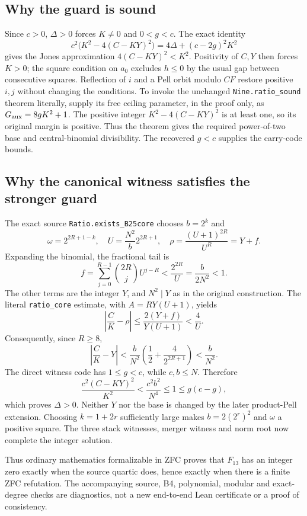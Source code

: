 \subsection*{Why the guard is sound}
Since $c>0$, $\Delta>0$ forces $K\ne0$ and $0<g<c$.  The exact identity
\[
 c^2\bigl(K^2-4(C-KY)^2\bigr)
   =4\Delta+(c-2g)^2K^2
\]
gives the Jones approximation $4(C-KY)^2<K^2$.  Positivity of $C,Y$
then forces $K>0$; the square condition on $a_0$ excludes $h\le0$ by the
usual gap between consecutive squares.  Reflection of $i$ and a Pell
orbit modulo $CF$ restore positive $i,j$ without changing the conditions.
To invoke the unchanged \texttt{Nine.ratio\_sound} theorem literally, supply
its free ceiling parameter, in the proof only, as $G_{\rm aux}=8gK^2+1$.
The positive integer $K^2-4(C-KY)^2$ is at least one, so its original
margin is positive.  Thus the theorem gives the required power-of-two
base and central-binomial divisibility.  The recovered $g<c$ supplies
the carry-code bounds.

\subsection*{Why the canonical witness satisfies the stronger guard}
The exact source \texttt{Ratio.exists\_B25core} chooses $b=2^k$ and
\[
 \omega=2^{2R+1-k},\quad
 U=\frac{N^2}{b}2^{2R+1},\quad
 \rho=\frac{(U+1)^{2R}}{U^R}=Y+f.
\]
Expanding the binomial, the fractional tail is
\[
 f=\sum_{j=0}^{R-1}\binom{2R}{j}U^{j-R}
   <\frac{2^{2R}}U=\frac{b}{2N^2}<1.
\]
The other terms are the integer $Y$, and $N^2\mid Y$ as in the original
construction.  The literal \texttt{ratio\_core} estimate, with
$A=RY(U+1)$, yields
\[
 \left|\frac CK-\rho\right|
 \le\frac{2(Y+f)}{Y(U+1)}<\frac4U.
\]
Consequently, since $R\ge8$,
\[
 \left|\frac CK-Y\right|
 <\frac b{N^2}\left(\frac12+\frac4{2^{2R+1}}\right)
 <\frac b{N^2}.
\]
The direct witness code has $1\le g<c$, while $c,b\le N$.  Therefore
\[
 \frac{c^2(C-KY)^2}{K^2}<\frac{c^2b^2}{N^4}\le1
 \le g(c-g),
\]
which proves $\Delta>0$.  Neither $Y$ nor the base is changed by the later
product-Pell extension.  Choosing $k=1+2r$ sufficiently large makes
$b=2(2^r)^2$ and $\omega$ a positive square.  The three stack witnesses,
merger witness and norm root now complete the integer solution.

Thus ordinary mathematics formalizable in ZFC proves that $F_{13}$ has an
integer zero exactly when the source quartic does, hence exactly when
there is a finite ZFC refutation.  The accompanying source, B4, polynomial,
modular and exact-degree checks are diagnostics, not a new end-to-end
Lean certificate or a proof of consistency.
